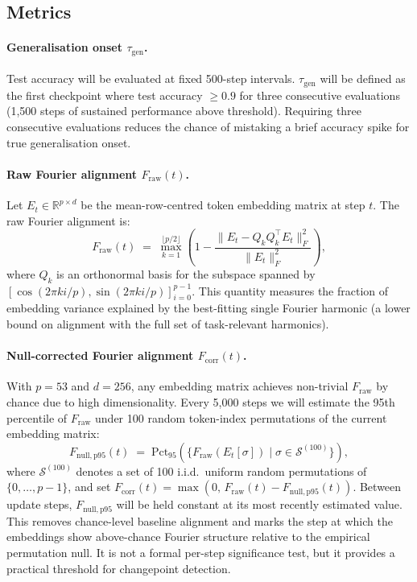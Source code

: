 \documentclass[12pt,openany,a4paper]{book}
\newcommand{\taug}{\tau_{\mathrm{gen}}}
\newcommand{\fcorr}{F_{\mathrm{corr}}}
\begin{document}
\subsection{Metrics}

\paragraph{Generalisation onset $\taug$.}
Test accuracy will be evaluated at fixed 500-step intervals.
$\taug$ will be defined as the first checkpoint where test accuracy
$\geq 0.9$ for three consecutive evaluations (1{,}500 steps of
sustained performance above threshold).
Requiring three consecutive evaluations reduces the chance of mistaking a brief accuracy spike for true generalisation onset.

\paragraph{Raw Fourier alignment $F_{\mathrm{raw}}(t)$.}
Let $E_t \in \mathbb{R}^{p \times d}$ be the mean-row-centred token
embedding matrix at step $t$.
The raw Fourier alignment is:
\begin{equation}
  F_{\mathrm{raw}}(t) \;=\;
  \max_{k=1}^{\lfloor p/2\rfloor}
  \!\left(1 - \frac{\|E_t - Q_k Q_k^\top E_t\|_F^2}
  {\|E_t\|_F^2}\right),
  \label{eq:f_raw}
\end{equation}
where $Q_k$ is an orthonormal basis for the subspace spanned by
$[\cos(2\pi k i/p),\sin(2\pi k i/p)]_{i=0}^{p-1}$.
This quantity measures the fraction of embedding variance explained
by the best-fitting single Fourier harmonic (a lower bound on
alignment with the full set of task-relevant harmonics).

\paragraph{Null-corrected Fourier alignment $\fcorr(t)$.}
With $p=53$ and $d=256$, any embedding matrix achieves non-trivial
$F_{\mathrm{raw}}$ by chance due to high dimensionality.
Every 5{,}000 steps we will estimate the 95th percentile of
$F_{\mathrm{raw}}$ under 100 random token-index permutations of the
current embedding matrix:
\begin{equation}
  F_{\mathrm{null,p95}}(t) \;=\;
  \mathrm{Pct}_{95}\!\left(
    \{F_{\mathrm{raw}}(E_t[\sigma]) \mid \sigma \in \mathcal{S}^{(100)}\}
  \right),
\end{equation}
where $\mathcal{S}^{(100)}$ denotes a set of 100 i.i.d.\ uniform random permutations of $\{0,\dots,p{-}1\}$,
and set $\fcorr(t) = \max(0,\, F_{\mathrm{raw}}(t) - F_{\mathrm{null,p95}}(t))$.
Between update steps, $F_{\mathrm{null,p95}}$ will be held constant at its
most recently estimated value.
This removes chance-level baseline alignment and marks the step at which the embeddings show above-chance Fourier structure relative to the empirical permutation null. It is not a formal per-step significance test, but it provides a practical threshold for changepoint detection.
\end{document}
